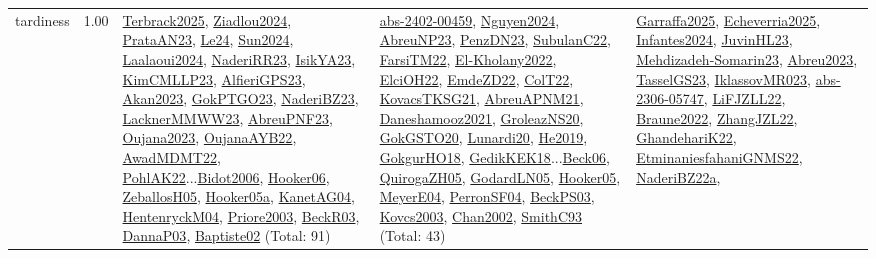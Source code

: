 {\begin{longtable}{p{3cm}r>{\raggedright\arraybackslash}p{6cm}>{\raggedright\arraybackslash}p{6cm}>{\raggedright\arraybackslash}p{8cm}}
\index{tardiness}\index{Concepts!tardiness}tardiness &  1.00 & \hyperref[detail:Terbrack2025]{Terbrack2025}, \hyperref[detail:Ziadlou2024]{Ziadlou2024}, \hyperref[detail:PrataAN23]{PrataAN23}, \hyperref[detail:Le24]{Le24}, \hyperref[detail:Sun2024]{Sun2024}, \hyperref[detail:Laalaoui2024]{Laalaoui2024}, \hyperref[detail:NaderiRR23]{NaderiRR23}, \hyperref[detail:IsikYA23]{IsikYA23}, \hyperref[detail:KimCMLLP23]{KimCMLLP23}, \hyperref[detail:AlfieriGPS23]{AlfieriGPS23}, \hyperref[detail:Akan2023]{Akan2023}, \hyperref[detail:GokPTGO23]{GokPTGO23}, \hyperref[detail:NaderiBZ23]{NaderiBZ23}, \hyperref[detail:LacknerMMWW23]{LacknerMMWW23}, \hyperref[detail:AbreuPNF23]{AbreuPNF23}, \hyperref[detail:Oujana2023]{Oujana2023}, \hyperref[detail:OujanaAYB22]{OujanaAYB22}, \hyperref[detail:AwadMDMT22]{AwadMDMT22}, \hyperref[detail:PohlAK22]{PohlAK22}...\hyperref[detail:Bidot2006]{Bidot2006}, \hyperref[detail:Hooker06]{Hooker06}, \hyperref[detail:ZeballosH05]{ZeballosH05}, \hyperref[detail:Hooker05a]{Hooker05a}, \hyperref[detail:KanetAG04]{KanetAG04}, \hyperref[detail:HentenryckM04]{HentenryckM04}, \hyperref[detail:Priore2003]{Priore2003}, \hyperref[detail:BeckR03]{BeckR03}, \hyperref[detail:DannaP03]{DannaP03}, \hyperref[detail:Baptiste02]{Baptiste02} (Total: 91) & \hyperref[detail:abs-2402-00459]{abs-2402-00459}, \hyperref[detail:Nguyen2024]{Nguyen2024}, \hyperref[detail:AbreuNP23]{AbreuNP23}, \hyperref[detail:PenzDN23]{PenzDN23}, \hyperref[detail:SubulanC22]{SubulanC22}, \hyperref[detail:FarsiTM22]{FarsiTM22}, \hyperref[detail:El-Kholany2022]{El-Kholany2022}, \hyperref[detail:ElciOH22]{ElciOH22}, \hyperref[detail:EmdeZD22]{EmdeZD22}, \hyperref[detail:ColT22]{ColT22}, \hyperref[detail:KovacsTKSG21]{KovacsTKSG21}, \hyperref[detail:AbreuAPNM21]{AbreuAPNM21}, \hyperref[detail:Daneshamooz2021]{Daneshamooz2021}, \hyperref[detail:GroleazNS20]{GroleazNS20}, \hyperref[detail:GokGSTO20]{GokGSTO20}, \hyperref[detail:Lunardi20]{Lunardi20}, \hyperref[detail:He2019]{He2019}, \hyperref[detail:GokgurHO18]{GokgurHO18}, \hyperref[detail:GedikKEK18]{GedikKEK18}...\hyperref[detail:Beck06]{Beck06}, \hyperref[detail:QuirogaZH05]{QuirogaZH05}, \hyperref[detail:GodardLN05]{GodardLN05}, \hyperref[detail:Hooker05]{Hooker05}, \hyperref[detail:MeyerE04]{MeyerE04}, \hyperref[detail:PerronSF04]{PerronSF04}, \hyperref[detail:BeckPS03]{BeckPS03}, \hyperref[detail:Kovcs2003]{Kovcs2003}, \hyperref[detail:Chan2002]{Chan2002}, \hyperref[detail:SmithC93]{SmithC93} (Total: 43) & \hyperref[detail:Garraffa2025]{Garraffa2025}, \hyperref[detail:Echeverria2025]{Echeverria2025}, \hyperref[detail:Infantes2024]{Infantes2024}, \hyperref[detail:JuvinHL23]{JuvinHL23}, \hyperref[detail:Mehdizadeh-Somarin23]{Mehdizadeh-Somarin23}, \hyperref[detail:Abreu2023]{Abreu2023}, \hyperref[detail:TasselGS23]{TasselGS23}, \hyperref[detail:IklassovMR023]{IklassovMR023}, \hyperref[detail:abs-2306-05747]{abs-2306-05747}, \hyperref[detail:LiFJZLL22]{LiFJZLL22}, \hyperref[detail:Braune2022]{Braune2022}, \hyperref[detail:ZhangJZL22]{ZhangJZL22}, \hyperref[detail:GhandehariK22]{GhandehariK22}, \hyperref[detail:EtminaniesfahaniGNMS22]{EtminaniesfahaniGNMS22}, \hyperref[detail:NaderiBZ22a]{NaderiBZ22a}, 
\end{longtable}}
